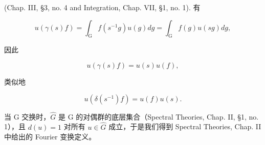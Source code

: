 (Chap. III, §3, no. 4 and Integration, Chap. VII, §1, no. 1). 有

\[
u (\gamma (s) f) = \int_ {\mathrm{G}} f (s ^ {- 1} g) u (g) d g = \int_ {\mathrm{G}} f (g) u (s g) d g,
\]

因此

\[
u (\gamma (s) f) = u (s) u (f),\tag{12}
\]

类似地

\[
u (\delta (s ^ {- 1}) f) = u (f) u (s).\tag{13}
\]

当 G 交换时，\(\hat{G}\) 是 G 的对偶群的底层集合（Spectral Theories, Chap. II, §1, no. 1），且 \(d(u) = 1\) 对所有 \(u \in \hat{G}\) 成立，于是我们得到 Spectral Theories, Chap. II 中给出的 Fourier 变换定义。

